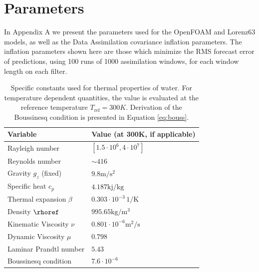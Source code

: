 \appendix
\addappheadtotoc

\titleformat{\chapter}[hang]{\normalfont\huge\bfseries}{\chaptertitlename\ \thechapter:}{1em}{} 

\chapter{Parameters}
\label{params}

In Appendix A we present the parameters used for the OpenFOAM and Lorenz63 models, as well as the Data Assimilation covariance inflation parameters.
The inflation parameters shown here are those which minimize the RMS forecast error of predictions, using 100 runs of 1000 assimilation windows, for each window length on each filter.

\begin{table}[h]
\caption[Specific constants used for thermal properties of water]{
  Specific constants used for thermal properties of water.
  For temperature dependent quantities, the value is evaluated at the reference temperature $T_\text{ref}  = 300K$.
  Derivation of the Boussinesq condition is presented in Equation \ref{eq:bouss}.
  }
\begin{center}
\begin{tabular}{ll}
\hline
Variable & Value (at 300K, if applicable)\\
\hline
\hline
Rayleigh number & $[1.5\cdot 10^6, 4\cdot 10^7]$\\
\hline
Reynolds number & $\sim 416$\\
\hline
Gravity $g_z$ (fixed) & $9.8 \text{m}/\text{s}^2$\\
\hline
Specific heat $c_p$ & $4.187 \text{kj}/\text{kg}$\\
\hline
Thermal expansion $\beta$ & $0.303\cdot 10^{-3} \,1/\text{K}$\\
\hline
Density $\rhoref$ & $995.65 \text{kg}/\text{m}^3$\\
\hline
Kinematic Viscosity $\nu$ & $0.801\cdot 10^{-6} \text{m}^2/\text{s}$\\
\hline
Dynamic Viscosity $\mu$ & $0.798$\\
\hline
Laminar Prandtl number & $5.43$\\
\hline
Boussinesq condition & $7.6\cdot 10^{-6}$\\
\hline
\end{tabular}
\label{tb:flowvariables}
\end{center}
\end{table}

